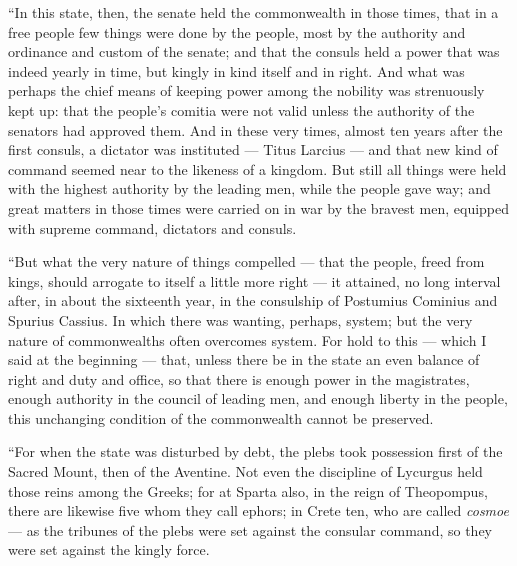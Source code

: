  ``In this state, then, the senate held the commonwealth in those times, that in a free people few things were done by the people, most by the authority and ordinance and custom of the senate; and that the consuls held a power that was indeed yearly in time, but kingly in kind itself and in right. And what was perhaps the chief means of keeping power among the nobility was strenuously kept up: that the people's comitia were not valid unless the authority of the senators had approved them. And in these very times, almost ten years after the first consuls, a dictator was instituted --- Titus Larcius --- and that new kind of command seemed near to the likeness of a kingdom. But still all things were held with the highest authority by the leading men, while the people gave way; and great matters in those times were carried on in war by the bravest men, equipped with supreme command, dictators and consuls.

 ``But what the very nature of things compelled --- that the people, freed from kings, should arrogate to itself a little more right --- it attained, no long interval after, in about the sixteenth year, in the consulship of Postumius Cominius and Spurius Cassius. In which there was wanting, perhaps, system; but the very nature of commonwealths often overcomes system. For hold to this --- which I said at the beginning --- that, unless there be in the state an even balance of right and duty and office, so that there is enough power in the magistrates, enough authority in the council of leading men, and enough liberty in the people, this unchanging condition of the commonwealth cannot be preserved.

 ``For when the state was disturbed by debt, the plebs took possession first of the Sacred Mount, then of the Aventine. Not even the discipline of Lycurgus held those reins among the Greeks; for at Sparta also, in the reign of Theopompus, there are likewise five whom they call ephors; in Crete ten, who are called \textit{cosmoe} --- as the tribunes of the plebs were set against the consular command, so they were set against the kingly force.

